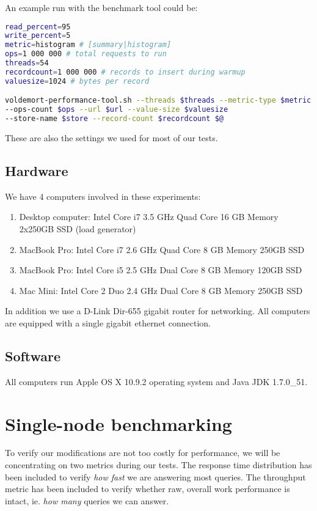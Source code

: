 An example run with the benchmark tool could be:
\begin{lstlisting}[language=bash]
read_percent=95
write_percent=5
metric=histogram # [summary|histogram]
ops=1 000 000 # total requests to run
threads=54
recordcount=1 000 000 # records to insert during warmup
valuesize=1024 # bytes per record

voldemort-performance-tool.sh --threads $threads --metric-type $metric 
--ops-count $ops --url $url --value-size $valuesize 
--store-name $store --record-count $recordcount $@
\end{lstlisting}

These are also the settings we used for most of our tests.

\subsection{Hardware}
We have 4 computers involved in these experiments:

\begin{enumerate}
	\item Desktop computer: Intel Core i7 3.5 GHz Quad Core  16 GB Memory 2x250GB SSD (load generator)
	\item MacBook Pro: Intel Core i7 2.6 GHz Quad Core 8 GB Memory 250GB SSD
	\item MacBook Pro: Intel Core i5 2.5 GHz Dual Core 8 GB Memory 120GB SSD
	\item Mac Mini: Intel Core 2 Duo 2.4 GHz Dual Core 8 GB Memory 250GB SSD
\end{enumerate}

In addition we use a D-Link Dir-655 gigabit router for networking. All computers are equipped with a single gigabit ethernet connection.

\subsection{Software}
All computers run Apple OS X 10.9.2 operating system and Java JDK 1.7.0\_51. 

\section{Single-node benchmarking}
To verify our modifications are not too costly for performance, we will be concentrating on two metrics during our tests. The response time distribution has been included to verify \emph{how fast} we are answering most queries. The throughput metric has been included to verify whether raw, overall work performance is intact, ie. \emph{how many} queries we can answer.

